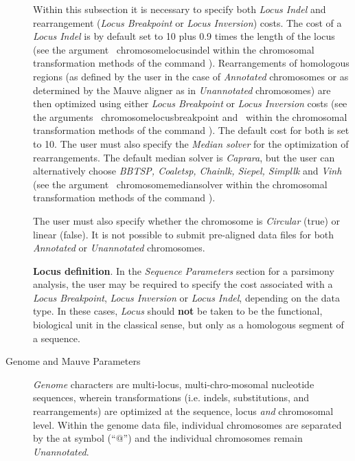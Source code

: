 \begin{description}
		\indent Within this subsection it is necessary to specify both \emph{Locus Indel} and rearrangement 
		(\emph{Locus Breakpoint} or \emph{Locus Inversion}) costs.  The cost of a \emph{Locus Indel} 
		is by default set to 10 plus 0.9 times the length of the locus (see the argument~
		{chromosomelocusindel}  within the chromosomal transformation methods of the command 
		). Rearrangements of homologous regions (as defined by the user in 
		the case of \emph{Annotated} chromosomes or as determined by the Mauve aligner as in 
		\emph{Unannotated} chromosomes) are then optimized using either \emph{Locus Breakpoint} 
		or \emph{Locus Inversion} costs (see the arguments~
		{chromosomelocusbreakpoint} and~
		 within the chromosomal transformation methods of the command ). 
		 The default cost for both is set to 10. The user must also specify the 
		\emph{Median solver} for the optimization of rearrangements. The default median solver is 
		\emph{Caprara}, but the user can alternatively choose \emph{BBTSP, Coaletsp, 
		Chainlk, Siepel, Simpllk} and \emph{Vinh} (see the argument~
		{chromosomemediansolver} within the chromosomal transformation methods of the command 
		).
		
		\indent The user must also specify whether the chromosome is \emph{Circular} (true) or linear (false).
		It is not possible to submit pre-aligned data files for both \emph{Annotated} or \emph{Unannotated} 
		chromosomes. 
			
\begin{statement}
    \textbf{Locus definition}. In the \emph{Sequence Parameters} section for a parsimony analysis, the user may be required 
	to specify the cost associated with a \emph{Locus Breakpoint}, \emph{Locus Inversion} or 
	\emph{Locus Indel}, depending on the data type. In these cases, \emph{Locus} should \textbf{not} 
	be taken to be the functional, biological unit in the classical sense, 	but only as a homologous 
	segment of a sequence.
\end{statement}
	
	\item [Genome and Mauve Parameters] \emph{Genome} characters are multi-locus, multi-chro-mosomal nucleotide 
		sequences, wherein transformations (i.e. indels, substitutions, and rearrangements) are optimized 
		at the sequence, locus \emph{and} chromosomal level.  Within the genome data file, individual 
		chromosomes are separated by the at symbol (``$@$'') and the individual chromosomes remain 
		\emph{Unannotated}. 
		

\end{description}
